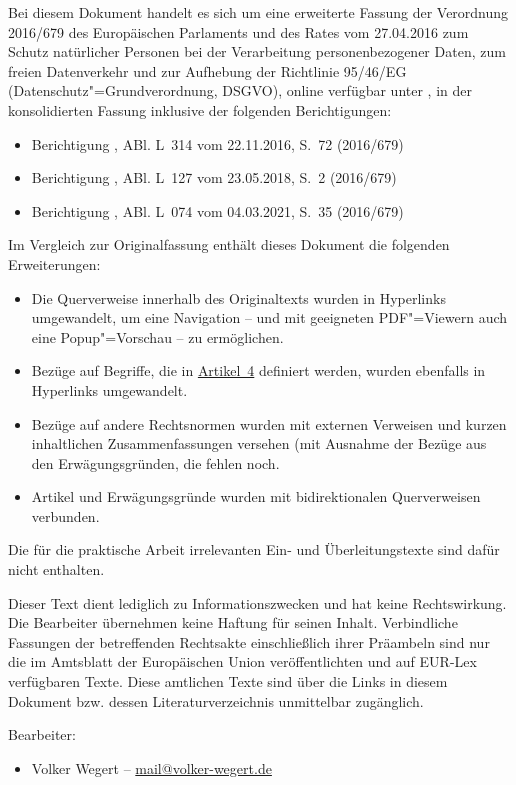 
Bei diesem Dokument handelt es sich um eine erweiterte Fassung der Verordnung 2016/679 des Europäischen Parlaments und
des Rates vom 27.04.2016 zum Schutz natürlicher Personen bei der Verarbeitung personenbezogener Daten, zum freien
Datenverkehr und zur Aufhebung der Richtlinie 95/46/EG (Datenschutz"=Grundverordnung, DSGVO), online verfügbar unter 
\cite{dsgvo-original}, in der konsolidierten Fassung inklusive der folgenden Berichtigungen:

\begin{itemize}
  \item Berichtigung \cite{dsgvo-korr-2016}, ABl. L~314 vom 22.11.2016, S.~72 (2016/679)
  \item Berichtigung \cite{dsgvo-korr-2018}, ABl. L~127 vom 23.05.2018, S.~2 (2016/679)
  \item Berichtigung \cite{dsgvo-korr-2021}, ABl. L~074 vom 04.03.2021, S.~35 (2016/679)
\end{itemize}

Im Vergleich zur Originalfassung enthält dieses Dokument die folgenden Erweiterungen:

\begin{itemize}

  \item Die Querverweise innerhalb des Originaltexts wurden in Hyperlinks umgewandelt, um eine Navigation -- und
   mit geeigneten PDF"=Viewern auch eine Popup"=Vorschau -- zu ermöglichen.

  \item Bezüge auf Begriffe, die in \hyperref[ch:4]{Artikel~4} definiert werden, wurden ebenfalls in Hyperlinks
   umgewandelt.

  \item Bezüge auf andere Rechtsnormen wurden mit externen Verweisen und kurzen inhaltlichen Zusammenfassungen versehen 
  (mit Ausnahme der Bezüge aus den Erwägungsgründen, die fehlen noch.

  \item Artikel und Erwägungsgründe wurden mit bidirektionalen Querverweisen verbunden.

\end{itemize}

Die für die praktische Arbeit irrelevanten Ein- und Überleitungstexte sind dafür nicht enthalten.

Dieser Text dient lediglich zu Informationszwecken und hat keine Rechtswirkung. Die Bearbeiter übernehmen keine Haftung
für seinen Inhalt. Verbindliche Fassungen der betreffenden Rechtsakte einschließlich ihrer Präambeln sind nur die im
Amtsblatt der Europäischen Union veröffentlichten und auf EUR-Lex verfügbaren Texte. Diese amtlichen Texte sind über
die Links in diesem Dokument bzw. dessen Literaturverzeichnis unmittelbar zugänglich.

Bearbeiter:

\begin{itemize}
  \item Volker Wegert -- \href{mailto:mail@volker-wegert.de}{mail@volker-wegert.de}
\end{itemize}